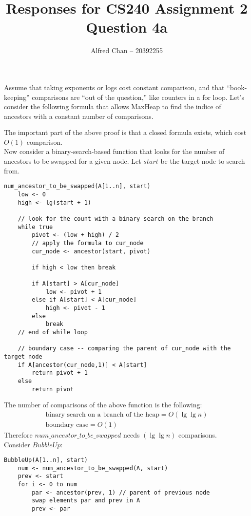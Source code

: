 \documentclass[12pt]{article}
\title{Responses for CS240 Assignment 2 Question 4a}
\author{Alfred Chan -- 20392255}
\begin{document}
\maketitle

Assume that taking exponents or logs cost constant comparison, and that ``book-keeping'' comparisons are ``out of the question,'' like counters in a for loop.
Let's consider the following formula that allows MaxHeap to find the indice of ancestors with a constant number of comparisons.

The important part of the above proof is that a closed formula exists, which cost $O(1)$ comparison.\\

Now consider a binary-search-based function that looks for the number of ancestors to be swapped for a given node.
Let $start$ be the target node to search from.
\begin{lstlisting}
num_ancestor_to_be_swapped(A[1..n], start)
	low <- 0
	high <- lg(start + 1)

	// look for the count with a binary search on the branch
	while true
		pivot <- (low + high) / 2
		// apply the formula to cur_node
		cur_node <- ancestor(start, pivot)

		if high < low then break

		if A[start] > A[cur_node]
			low <- pivot + 1
		else if A[start] < A[cur_node]
			high <- pivot - 1
		else
			break
	// end of while loop

	// boundary case -- comparing the parent of cur_node with the target node
	if A[ancestor(cur_node,1)] < A[start]
		return pivot + 1
	else
		return pivot
\end{lstlisting}
The number of comparisons of the above function is the following:
\begin{align*}
\text{binary search on a branch of the heap} = O(\lg\lg n)\\
\text{boundary case} = O(1)
\end{align*}
Therefore $num\_ancestor\_to\_be\_swapped$ needs $(\lg\lg n)$ comparisons.\\
Consider $BubbleUp$:
\begin{lstlisting}
BubbleUp(A[1..n], start)
	num <- num_ancestor_to_be_swapped(A, start)
	prev <- start
	for i <- 0 to num
		par <- ancestor(prev, 1) // parent of previous node
		swap elements par and prev in A
		prev <- par
\end{lstlisting}
\end{document}
